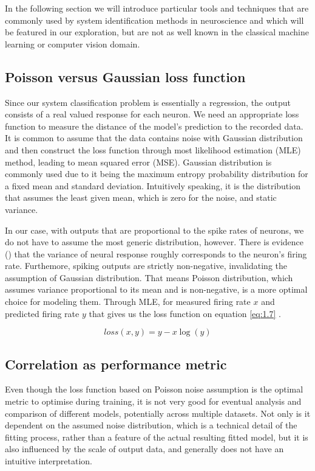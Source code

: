 In the following section we will introduce particular tools and techniques that are commonly used by system identification methods in neuroscience and which will be featured in our exploration, but are not as well known in the classical machine learning or computer vision domain. 

\subsection{Poisson versus Gaussian loss function}\label{ch:1.4.1}

Since our system classification problem is essentially a regression, the output consists of a real valued response for each neuron. We need an appropriate loss function to measure the distance of the model’s prediction to the recorded data. It is common to assume that the data contains noise with Gaussian distribution and then construct the loss function through most likelihood estimation (MLE) method, leading to mean squared error (MSE). Gaussian distribution is commonly used due to it being the maximum entropy probability distribution for a fixed mean and standard deviation. Intuitively speaking, it is the distribution that assumes the least given mean, which is zero for the noise, and static variance.

In our case, with outputs that are proportional to the spike rates of neurons, we do not have to assume the most generic distribution, however. There is evidence (\cite{Goris2014}) that the variance of neural response roughly corresponds to the neuron’s firing rate. Furthemore, spiking outputs are strictly non-negative, invalidating the assumption of Gaussian distribution. That means Poisson distribution, which assumes variance proportional to its mean and is non-negative, is a more optimal choice for modeling them. Through MLE, for measured firing rate $x$ and predicted firing rate $y$ that gives us the loss function on equation \ref{eq:1.7} .

\begin{equation}\label{eq:1.7}
    loss(x,y)=y-x\log{(y)}
\end{equation}

\subsection{Correlation as performance metric}\label{ch:1.4.2}

Even though the loss function based on Poisson noise assumption is the optimal metric to optimise during training, it is not very good for eventual analysis and comparison of different models, potentially across multiple datasets. Not only is it dependent on the assumed noise distribution, which is a technical detail of the fitting process, rather than a feature of the actual resulting fitted model, but it is also influenced by the scale of output data, and generally does not have an intuitive interpretation.

